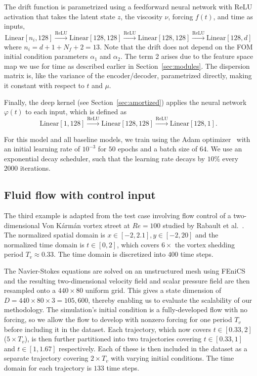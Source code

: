 \documentclass{article}
\begin{document}
	The drift function is parametrized using a feedforward neural network with {\sf ReLU} activation that takes the latent state $z$, the viscosity $\nu$, forcing $f(t)$, and time as inputs,
	\begin{equation*}
		\textrm{Linear}[n_i, 128] \xrightarrow{\text{ReLU}} \textrm{Linear}[128, 128] \xrightarrow{\text{ReLU}} \textrm{Linear}[128, 128] \xrightarrow{\text{ReLU}} \textrm{Linear}[128, d]
	\end{equation*}
	where $n_i = d+1+N_f+2 = 13$. Note that the drift does not depend on the FOM initial condition parameters $\alpha_1$ and $\alpha_2$. The term 2 arises due to the feature space map we use for time as described earlier in Section~\ref{sec:modules}. The dispersion matrix is, like the variance of the encoder/decoder, parametrized directly, making it constant with respect to $t$ and $\mu$.
	
	Finally, the deep kernel (see Section~\ref{sec:amortized}) applies the neural network $\varphi(t)$ to each input, which is defined as
	\begin{equation*}
		\textrm{Linear}[1, 128] \xrightarrow{\text{ReLU}} \textrm{Linear}[128, 128] \xrightarrow{\text{ReLU}} \textrm{Linear}[128, 1].
	\end{equation*}
	
	For this model and all baseline models, we train using the Adam optimizer~\cite{Kingma_2017_Adam} with an initial learning rate of $10^{-3}$ for $50$ epochs and a batch size of $64$. We use an exponential decay scheduler, such that the learning rate decays by $10\%$ every $2000$ iterations.
	
	\subsection{Fluid flow with control input} \label{sec:flowdetails}
	
	The third example is adapted from the test case involving flow control of a two-dimensional Von K\'{a}rm\'{a}n vortex street at $Re=100$ studied by Rabault et al.~\cite{Rabault_2019_Flow_Control_DRL}. The normalized spatial domain is $x \in [-2, 2.1], y \in [-2, 20]$ and the normalized time domain is $t\in [0, 2]$, which covers $6\times$ the vortex shedding period $T_v \approx 0.33$. The time domain is discretized into $400$ time steps.
	
	The Navier-Stokes equations are solved on an unstructured mesh using FEniCS~\cite{Logg_2011_FEniCS} and the resulting two-dimensional velocity field and scalar pressure field are then resampled onto a $440\times 80$ uniform grid. 
	This gives a state dimension of $D = 440 \times 80 \times 3 = 105,600$, thereby enabling us to evaluate the scalability of our methodology.  
	The simulation's initial condition is a fully-developed flow with no forcing, so we allow the flow to develop with nonzero forcing for one period $T_v$ before including it in the dataset. Each trajectory, which now covers $t \in [0.33, 2]$ ($5\times T_v$), is then further partitioned into two trajectories covering $t \in [0.33, 1]$ and $t \in [1, 1.67]$ respectively. Each of these is then included in the dataset as a separate trajectory covering $2\times T_v$ with varying initial conditions. The time domain for each trajectory is $133$ time steps.
	
\end{document}
